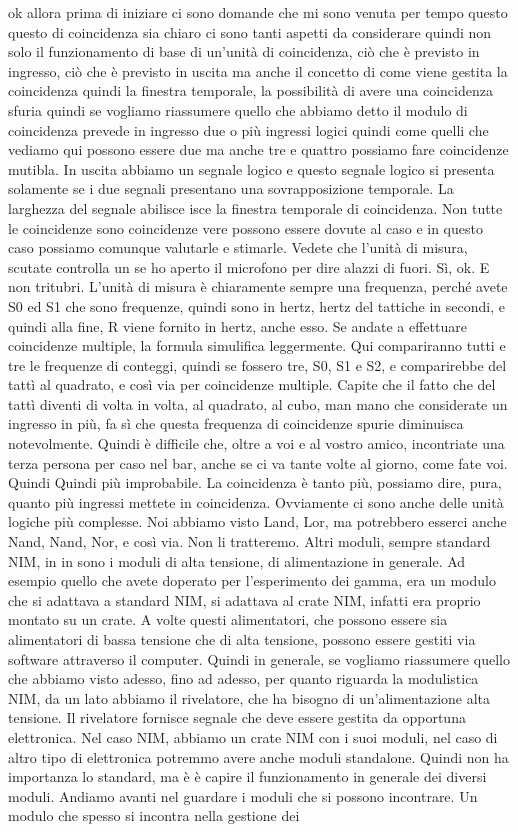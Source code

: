 {ok allora prima di iniziare ci sono domande che mi sono venuta per tempo questo questo di coincidenza sia chiaro ci sono tanti aspetti da considerare quindi non solo il funzionamento di base di un'unità di coincidenza, ciò che è previsto in ingresso, ciò che è previsto in uscita ma anche il concetto di come viene gestita la coincidenza quindi la finestra temporale, la possibilità di avere una coincidenza sfuria quindi se vogliamo riassumere quello che abbiamo detto il modulo di coincidenza prevede in ingresso due o più ingressi logici quindi come quelli che vediamo qui possono essere due ma anche tre e quattro possiamo fare coincidenze mutibla. In uscita abbiamo un segnale logico e questo segnale logico si presenta solamente se i due segnali presentano una sovrapposizione temporale. La larghezza del segnale abilisce isce la finestra temporale di coincidenza. Non tutte le coincidenze sono coincidenze vere possono essere dovute al caso e in questo caso possiamo comunque valutarle e stimarle. Vedete che l'unità di misura, scutate controlla un se ho aperto il microfono per dire alazzi di fuori. Sì, ok. E non tritubri. L'unità di misura è chiaramente sempre una frequenza, perché avete S0 ed S1 che sono frequenze, quindi sono in hertz, hertz del tattiche in secondi, e quindi alla fine, R viene fornito in hertz, anche esso. Se andate a effettuare coincidenze multiple, la formula simulifica leggermente. Qui compariranno tutti e tre le frequenze di conteggi, quindi se fossero tre, S0, S1 e S2, e comparirebbe del tattì al quadrato, e così via per coincidenze multiple. Capite che il fatto che del tattì diventi di volta in volta, al quadrato, al cubo, man mano che considerate un ingresso in più, fa sì che questa frequenza di coincidenze spurie diminuisca notevolmente. Quindi è difficile che, oltre a voi e al vostro amico, incontriate una terza persona per caso nel bar, anche se ci va tante volte al giorno, come fate voi. Quindi Quindi più improbabile. La coincidenza è tanto più, possiamo dire, pura, quanto più ingressi mettete in coincidenza. Ovviamente ci sono anche delle unità logiche più complesse. Noi abbiamo visto Land, Lor, ma potrebbero esserci anche Nand, Nand, Nor, e così via. Non li tratteremo. Altri moduli, sempre standard NIM, in in sono i moduli di alta tensione, di alimentazione in generale. Ad esempio quello che avete doperato per l'esperimento dei gamma, era un modulo che si adattava a standard NIM, si adattava al crate NIM, infatti era proprio montato su un crate. A volte questi alimentatori, che possono essere sia alimentatori di bassa tensione che di alta tensione, possono essere gestiti via software attraverso il computer. Quindi in generale, se vogliamo riassumere quello che abbiamo visto adesso, fino ad adesso, per quanto riguarda la modulistica NIM, da un lato abbiamo il rivelatore, che ha bisogno di un'alimentazione alta tensione. Il rivelatore fornisce segnale che deve essere gestita da opportuna elettronica. Nel caso NIM, abbiamo un crate NIM con i suoi moduli, nel caso di altro tipo di elettronica potremmo avere anche moduli standalone. Quindi non ha importanza lo standard, ma è è capire il funzionamento in generale dei diversi moduli. Andiamo avanti nel guardare i moduli che si possono incontrare. Un modulo che spesso si incontra nella gestione dei }
